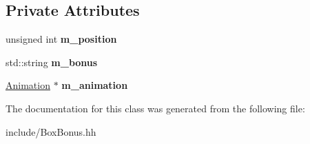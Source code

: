 \subsection*{Private Attributes}
\begin{DoxyCompactItemize}
\item 
\hypertarget{class_box_bonus_a8406e38593ecb6ed15258fb32fbc1ced}{}unsigned int {\bfseries m\+\_\+position}\label{class_box_bonus_a8406e38593ecb6ed15258fb32fbc1ced}

\item 
\hypertarget{class_box_bonus_a21ebb471619b3a59af74e3d296c1f7fa}{}std\+::string {\bfseries m\+\_\+bonus}\label{class_box_bonus_a21ebb471619b3a59af74e3d296c1f7fa}

\item 
\hypertarget{class_box_bonus_aa2a3173669fcbdda2dc4a12d70daa0c0}{}\hyperlink{class_animation}{Animation} $\ast$ {\bfseries m\+\_\+animation}\label{class_box_bonus_aa2a3173669fcbdda2dc4a12d70daa0c0}

\end{DoxyCompactItemize}


The documentation for this class was generated from the following file\+:\begin{DoxyCompactItemize}
\item 
include/Box\+Bonus.\+hh\end{DoxyCompactItemize}
